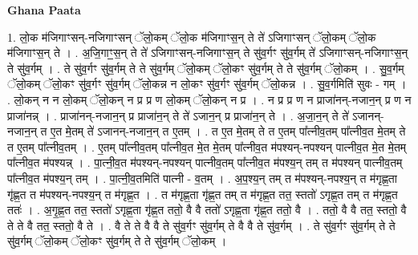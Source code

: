 \documentclass[17pt]{extarticle}
\begin{document}
\textbf{Ghana Paata } \newline

1. लो॒क म॑जिगाꣳसन्-नजिगाꣳसन् ॅलो॒कम् ॅलो॒क म॑जिगाꣳस॒न् ते ते॑ ऽजिगाꣳसन् ॅलो॒कम् ॅलो॒क म॑जिगाꣳस॒न् ते । . अ॒जि॒गाꣳ॒॒स॒न् ते ते॑ ऽजिगाꣳसन्-नजिगाꣳस॒न् ते सु॑व॒र्गꣳ सु॑व॒र्गम् ते॑ ऽजिगाꣳसन्-नजिगाꣳस॒न् ते सु॑व॒र्गम् । . ते सु॑व॒र्गꣳ सु॑व॒र्गम् ते ते सु॑व॒र्गम् ॅलो॒कम् ॅलो॒कꣳ सु॑व॒र्गम् ते ते सु॑व॒र्गम् ॅलो॒कम् । . सु॒व॒र्गम् ॅलो॒कम् ॅलो॒कꣳ सु॑व॒र्गꣳ सु॑व॒र्गम् ॅलो॒कन्न न लो॒कꣳ सु॑व॒र्गꣳ सु॑व॒र्गम् ॅलो॒कन्न । . सु॒व॒र्गमिति॑ सुवः - गम् । . लो॒कन् न न लो॒कम् ॅलो॒कन् न प्र प्र ण लो॒कम् ॅलो॒कन् न प्र । . न प्र प्र ण न प्राजा॑नन्-नजान॒न् प्र ण न प्राजा॑नन्न् । . प्राजा॑नन्-नजान॒न् प्र प्राजा॑न॒न् ते ते॑ ऽजान॒न् प्र प्राजा॑न॒न् ते । . अ॒जा॒न॒न् ते ते॑ ऽजानन्-नजान॒न् त ए॒त मे॒तम् ते॑ ऽजानन्-नजान॒न् त ए॒तम् । . त ए॒त मे॒तम् ते त ए॒तम् पा᳚त्नीव॒तम् पा᳚त्नीव॒त मे॒तम् ते त ए॒तम् पा᳚त्नीव॒तम् । . ए॒तम् पा᳚त्नीव॒तम् पा᳚त्नीव॒त मे॒त मे॒तम् पा᳚त्नीव॒त म॑पश्यन्-नपश्यन् पात्नीव॒त मे॒त मे॒तम् पा᳚त्नीव॒त म॑पश्यन्न् । . पा॒त्नी॒व॒त म॑पश्यन्-नपश्यन् पात्नीव॒तम् पा᳚त्नीव॒त म॑पश्य॒न् तम् त म॑पश्यन् पात्नीव॒तम् पा᳚त्नीव॒त म॑पश्य॒न् तम् । . पा॒त्नी॒व॒तमिति॑ पात्नी - व॒तम् । . अ॒प॒श्य॒न् तम् त म॑पश्यन्-नपश्य॒न् त म॑गृह्ण॒ता गृ॑ह्ण॒त त म॑पश्यन्-नपश्य॒न् त म॑गृह्ण॒त । . त म॑गृह्ण॒ता गृ॑ह्ण॒त तम् त म॑गृह्ण॒त तत॒ स्ततो॑ ऽगृह्ण॒त तम् त म॑गृह्ण॒त ततः॑ । . अ॒गृ॒ह्ण॒त तत॒ स्ततो॑ ऽगृह्ण॒ता गृ॑ह्ण॒त ततो॒ वै वै ततो॑ ऽगृह्ण॒ता गृ॑ह्ण॒त ततो॒ वै । . ततो॒ वै वै तत॒ स्ततो॒ वै ते ते वै तत॒ स्ततो॒ वै ते । . वै ते ते वै वै ते सु॑व॒र्गꣳ सु॑व॒र्गम् ते वै वै ते सु॑व॒र्गम् । . ते सु॑व॒र्गꣳ सु॑व॒र्गम् ते ते सु॑व॒र्गम् ॅलो॒कम् ॅलो॒कꣳ सु॑व॒र्गम् ते ते सु॑व॒र्गम् ॅलो॒कम् । \newline
\end{document}
